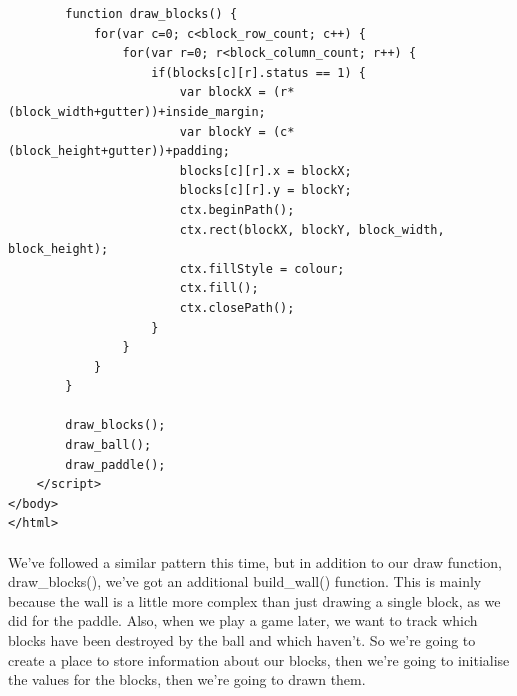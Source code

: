\documentclass[10pt, a4paper, oneside]{article}
\begin{document}
\begin{lstlisting}
        function draw_blocks() {
            for(var c=0; c<block_row_count; c++) {
                for(var r=0; r<block_column_count; r++) {
                    if(blocks[c][r].status == 1) {
                        var blockX = (r*(block_width+gutter))+inside_margin;
                        var blockY = (c*(block_height+gutter))+padding;
                        blocks[c][r].x = blockX;
                        blocks[c][r].y = blockY;
                        ctx.beginPath();
                        ctx.rect(blockX, blockY, block_width, block_height);
                        ctx.fillStyle = colour;
                        ctx.fill();
                        ctx.closePath();
                    }
                }
            }
        }

        draw_blocks();
        draw_ball();
        draw_paddle();
    </script>
</body>
</html>
\end{lstlisting}

\paragraph{} We've followed a similar pattern this time, but in addition to our draw function, draw\_blocks(), we've got an additional build\_wall() function. This is mainly because the wall is a little more complex than just drawing a single block, as we did for the paddle. Also, when we play a game later, we want to track which blocks have been destroyed by the ball and which haven't. So we're going to create a place to store information about our blocks, then we're going to initialise the values for the blocks, then we're going to drawn them.
\end{document}
